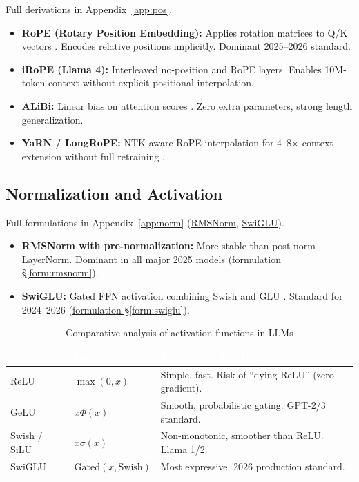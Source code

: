 Full derivations in Appendix~\ref{app:pos}.
\begin{itemize}
  \item \textbf{RoPE (Rotary Position Embedding):} Applies rotation matrices to Q/K vectors \parencite{su2024roformer}. Encodes relative positions implicitly. Dominant 2025--2026 standard.
  \item \textbf{iRoPE (Llama 4):} Interleaved no-position and RoPE layers. Enables 10M-token context without explicit positional interpolation.
  \item \textbf{ALiBi:} Linear bias on attention scores \parencite{press2022train}. Zero extra parameters, strong length generalization.
  \item \textbf{YaRN / LongRoPE:} NTK-aware RoPE interpolation for 4--8$\times$ context extension without full retraining \parencite{peng2023yarn}.
\end{itemize}

\subsection{Normalization and Activation}

Full formulations in Appendix~\ref{app:norm} (\hyperref[form:rmsnorm]{RMSNorm}, \hyperref[form:swiglu]{SwiGLU}).
\begin{itemize}
  \item \textbf{RMSNorm with pre-normalization:} More stable than post-norm LayerNorm. Dominant in all major 2025 models (\hyperref[form:rmsnorm]{formulation \S\ref*{form:rmsnorm}}).
  \item \textbf{SwiGLU:} Gated FFN activation combining Swish and GLU \parencite{shazeer2020glu}. Standard for 2024--2026 (\hyperref[form:swiglu]{formulation \S\ref*{form:swiglu}}).
\end{itemize}

\begin{table}[H]
\centering\small\sffamily
{}
\begin{tabular}{L{2cm}L{3.5cm}L{5cm}}
\toprule
{}\textcolor{white}{\textbf{Function}} & \textcolor{white}{\textbf{Formulation}} & \textcolor{white}{\textbf{Key Trade-off / Usage}} \\
\midrule
ReLU & $\max(0, x)$ & Simple, fast. Risk of ``dying ReLU'' (zero gradient). \\
GeLU & $x \Phi(x)$ & Smooth, probabilistic gating. GPT-2/3 standard. \\
Swish / SiLU & $x \sigma(x)$ & Non-monotonic, smoother than ReLU. Llama 1/2. \\
SwiGLU & $\text{Gated}(x, \text{Swish})$ & Most expressive. 2026 production standard. \\
\bottomrule
\end{tabular}
\caption{Comparative analysis of activation functions in LLMs}
\end{table}

